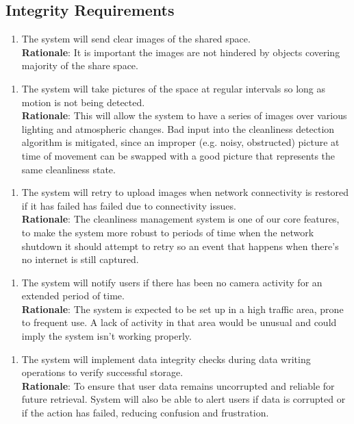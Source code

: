 \documentclass[12pt, titlepage]{article}
\begin{document}
\subsection{Integrity Requirements}
\begin{enumerate}[{IR}1. ]
    \item The system will send clear images of the shared space.\\
    \textbf{Rationale}: It is important the images are not hindered by objects covering majority of the share space. 
\end{enumerate}
\begin{enumerate}[{IR}2. ]
    \item The system will take pictures of the space at regular intervals so long as motion is not being detected.\\
    \textbf{Rationale}: This will allow the system to have a series of images over various lighting and atmospheric changes. Bad input into the cleanliness detection algorithm is mitigated, since an improper (e.g. noisy, obstructed) picture at time of movement can be swapped with a good picture that represents the same cleanliness state.
\end{enumerate}  
\begin{enumerate}[{IR}3. ]
    \item The system will retry to upload images when network connectivity is restored if it has failed has failed due to connectivity issues.\\
    \textbf{Rationale}: The cleanliness management system is one of our core features, to make the system more robust to periods of time when the network shutdown it should attempt to retry so an event that happens when there's no internet is still captured. 
\end{enumerate} 
\begin{enumerate}[{IR}4. ]
    \item The system will notify users if there has been no camera activity for an extended period of time.\\
    \textbf{Rationale}: The system is expected to be set up in a high traffic area, prone to frequent use. A lack of activity in that area would be unusual and could imply the system isn't working properly.
\end{enumerate}
\begin{enumerate}[{IR}5. ]
    \item The system will implement data integrity checks during data writing operations to verify successful storage.\\
    \textbf{Rationale}:  To ensure that user data remains uncorrupted and reliable for future retrieval. System will also be able to alert users if data is corrupted or if the action has failed, reducing confusion and frustration.
\end{enumerate} 
\end{document}
